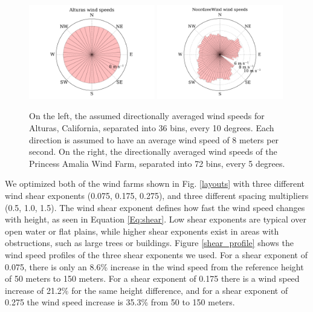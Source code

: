 \documentclass[WESD, manuscript]{copernicus}
\begin{document}
%
\begin{figure}[htbp]
  \centering
  \includegraphics[width=0.49\textwidth]{Figures/alturas_speeds.pdf}
  \includegraphics[width=0.49\textwidth]{Figures/NZW_speeds.pdf}
  \caption{\label{wind_speeds} On the left, the assumed directionally averaged wind speeds for Alturas, California, separated into 36 bins, every 10 degrees. Each direction is assumed to have an average wind speed of 8 meters per second. On the right, the directionally averaged wind speeds of the Princess Amalia Wind Farm, separated into 72 bins, every 5 degrees.}
\end{figure}


We optimized both of the wind farms shown in Fig. \ref{layouts} with three different wind shear exponents (0.075, 0.175, 0.275), and three different spacing multipliers (0.5, 1.0, 1.5). The wind shear exponent defines how fast the wind speed changes with height, as seen in Equation \ref{Eq:shear}. Low shear exponents are typical over open water or flat plains, while higher shear exponents exist in areas with obstructions, such as large trees or buildings. Figure \ref{shear_profile} shows the wind speed profiles of the three shear exponents we used. For a shear exponent of 0.075, there is only an 8.6\% increase in the wind speed from the reference height of 50 meters to 150 meters. For a shear exponent of 0.175 there is a wind speed increase of 21.2\% for the same height difference, and for a shear exponent of 0.275 the wind speed increase is 35.3\% from 50 to 150 meters. 
\end{document}

